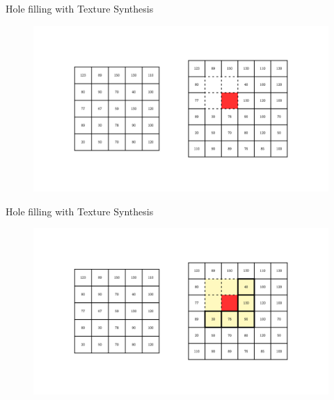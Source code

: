\documentclass{beamer}
\begin{document}
\begin{frame}{Hole filling with Texture Synthesis}
    \begin{figure}[h]
        \centering
        \includegraphics[width=1\textwidth]{2.png} %
        \captionsetup{labelformat=empty}
    \end{figure}
\end{frame}

\begin{frame}{Hole filling with Texture Synthesis}
    \begin{figure}[h]
        \centering
        \includegraphics[width=1\textwidth]{3.png} %
        \captionsetup{labelformat=empty}
    \end{figure}
\end{frame}
\end{document}
